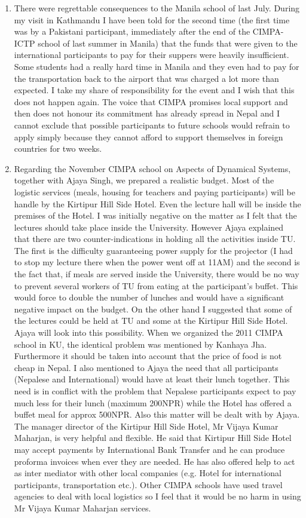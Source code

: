 \documentclass[12pt]{scrartcl}
\begin{document}
\begin{enumerate}
\item There were regrettable consequences to the Manila school of last July. 
During my visit in Kathmandu I have been told for the second time (the first time was by a Pakistani participant, immediately after the end of 
the CIMPA-ICTP school of last summer in Manila) that the funds that were given to the international participants to pay for their suppers were 
heavily insufficient. 
Some students had a really hard time in Manila and they even had to pay for the transportation back to the airport that was charged a lot more 
than expected. I take my share of responsibility for the event and I wish that this does not happen again. The voice that CIMPA promises 
local support and then does not honour its commitment has already spread in Nepal and I cannot exclude that possible participants to future 
schools would refrain to apply simply because they cannot afford to support themselves in foreign countries for two weeks. 

\item Regarding the November CIMPA school on Aspects of Dynamical Systems, together with Ajaya Singh, 
we prepared a realistic budget. Most of the logistic services (meals, housing for teachers and paying participants) will be handle by the 
Kirtipur Hill Side Hotel. 
Even the lecture hall will be inside the premises of the Hotel. I was initially negative on the matter as I felt that the lectures
should take place inside the University. However Ajaya explained that there are two counter-indications in holding all the 
activities inside TU. The first is the difficulty guaranteeing power supply for the projector (I had to stop my lecture there when
the power went off at 11AM) and the second is the fact that, if meals are served inside the University, there would be no way to
prevent several workers of TU from eating at the participant's buffet. This would force to double the number of lunches and would have 
a significant negative impact on the budget. On the other hand I suggested that some of the lectures could be held at TU and some
at the Kirtipur Hill Side Hotel. Ajaya will look into this possibility. When we organized the 2011 CIMPA school in KU, the identical problem
was mentioned by Kanhaya Jha. Furthermore it should be taken into account that the price of food is not cheap in Nepal. I also mentioned
to Ajaya the need that all participants (Nepalese and International) would have at least their lunch together. This need is in conflict
with the problem that Nepalese participants expect to pay much less for their lunch (maximum 200NPR) while the Hotel has offered a buffet
meal for approx 500NPR. Also this matter will be dealt with by Ajaya. The manager director of the Kirtipur Hill Side Hotel, Mr Vijaya Kumar 
Maharjan, is very helpful and flexible. He said that Kirtipur Hill Side Hotel may accept payments by International Bank Transfer and he can produce 
proforma invoices when ever they are needed. He has also offered help to act as inter mediator with other local companies 
(e.g. Hotel for international participants, transportation etc.). Other CIMPA schools have used travel agencies to deal with local
logistics so I feel that it would be no harm in using Mr Vijaya Kumar Maharjan services. 


\end{enumerate}
\end{document}
